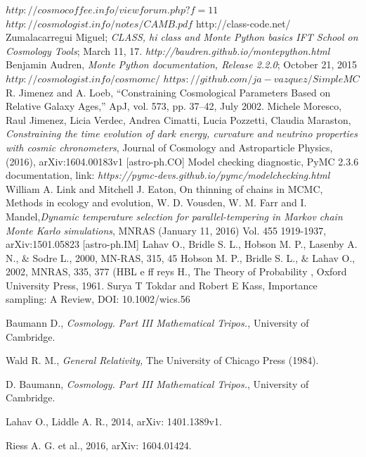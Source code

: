\documentclass[onecolumn,           %
               showpacs,            %
               preprintnumbers,     %
               aps,                 %
               letterpaper,             %
               superscriptaddress,      %
               nofootinbib,         %
               tightenlines,        %
               floats,floatfix      %
               ,usenatbib,
               ]{revtex4-1}
\begin{document}
\begin{thebibliography}{9}
$http://cosmocoffee.info/viewforum.php?f=11$
 $http://cosmologist.info/notes/CAMB.pdf$
 http://class-code.net/
Zumalacarregui Miguel; \textit{CLASS, hi class and Monte Python basics IFT School on Cosmology Tools}; March 11, 17.
\textit{http://baudren.github.io/montepython.html}
Benjamin Audren, \textit{Monte Python documentation, Release 2.2.0}; October 21, 2015
$http://cosmologist.info/cosmomc/$	
$https://github.com/ja-vazquez/SimpleMC$
%
%
%
%
%
%
R. Jimenez and A. Loeb, “Constraining Cosmological Parameters Based on Relative Galaxy Ages,”
ApJ, vol. 573, pp. 37–42, July 2002.
Michele Moresco, Raul Jimenez, Licia Verdec, Andrea Cimatti, Lucia Pozzetti, Claudia Maraston, \textit{Constraining the time evolution of dark energy, curvature and neutrino properties with cosmic chronometers}, Journal of Cosmology and Astroparticle Physics, (2016), arXiv:1604.00183v1 [astro-ph.CO]
 Model checking diagnostic, PyMC 2.3.6 documentation, link: \textit{https://pymc-devs.github.io/pymc/modelchecking.html}
William A. Link and Mitchell J. Eaton, On thinning of chains in MCMC, Methods in ecology and evolution,
W. D. Vousden, W. M. Farr and I. Mandel,\textit{Dynamic temperature selection for parallel-tempering in Markov chain Monte Karlo simulations}, MNRAS (January 11, 2016) Vol. 455 1919-1937, arXiv:1501.05823 [astro-ph.IM]
Lahav O., Bridle S. L., Hobson M. P., Lasenby A. N., $\&$ Sodre L., 2000, MN-RAS, 315, 45
Hobson M. P., Bridle S. L., $\&$ Lahav O., 2002, MNRAS, 335, 377 (HBL
e
ff
reys H.,
The Theory of Probability
, Oxford University Press, 1961.
Surya T Tokdar and Robert E Kass, Importance sampling: A Review, DOI: 10.1002/wics.56

 Baumann D., \textit{Cosmology. Part III Mathematical Tripos.,} University of Cambridge.

 Wald R. M., \textit{General Relativity,} The University of Chicago Press (1984).

 D. Baumann, {\em Cosmology. Part III Mathematical Tripos.}, University of Cambridge.

 Lahav O., Liddle A. R., 2014, arXiv: 1401.1389v1.

 Riess A. G. et al., 2016, arXiv: 1604.01424.


\end{thebibliography}
\end{document}
